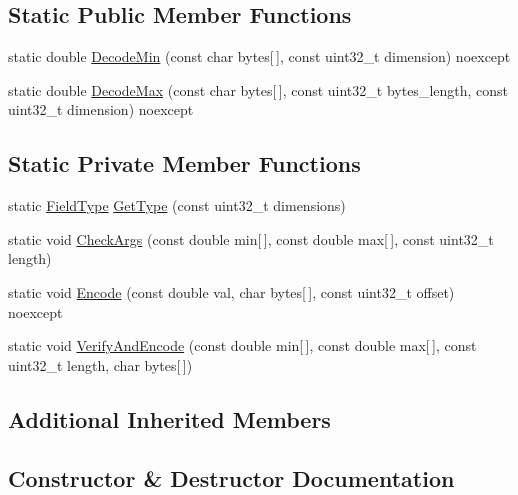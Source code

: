 \subsection*{Static Public Member Functions}
\begin{DoxyCompactItemize}
\item 
static double \mbox{\hyperlink{classlucene_1_1core_1_1document_1_1DoubleRange_a736e2ceb6f00b32f7867ec702da059b4}{Decode\+Min}} (const char bytes\mbox{[}$\,$\mbox{]}, const uint32\+\_\+t dimension) noexcept
\item 
static double \mbox{\hyperlink{classlucene_1_1core_1_1document_1_1DoubleRange_ad344a7b94c98b695feae8728ddc0de63}{Decode\+Max}} (const char bytes\mbox{[}$\,$\mbox{]}, const uint32\+\_\+t bytes\+\_\+length, const uint32\+\_\+t dimension) noexcept
\end{DoxyCompactItemize}
\subsection*{Static Private Member Functions}
\begin{DoxyCompactItemize}
\item 
static \mbox{\hyperlink{classlucene_1_1core_1_1document_1_1FieldType}{Field\+Type}} \mbox{\hyperlink{classlucene_1_1core_1_1document_1_1DoubleRange_a358b2b706f12ead3d2ca826d2faf7cf4}{Get\+Type}} (const uint32\+\_\+t dimensions)
\item 
static void \mbox{\hyperlink{classlucene_1_1core_1_1document_1_1DoubleRange_a10f3d27b685db535202452f5ba8693b9}{Check\+Args}} (const double min\mbox{[}$\,$\mbox{]}, const double max\mbox{[}$\,$\mbox{]}, const uint32\+\_\+t length)
\item 
static void \mbox{\hyperlink{classlucene_1_1core_1_1document_1_1DoubleRange_a2763582d3f37e3a080fc1e2afe48277c}{Encode}} (const double val, char bytes\mbox{[}$\,$\mbox{]}, const uint32\+\_\+t offset) noexcept
\item 
static void \mbox{\hyperlink{classlucene_1_1core_1_1document_1_1DoubleRange_a2171d66292b3437034c90c68baaa08db}{Verify\+And\+Encode}} (const double min\mbox{[}$\,$\mbox{]}, const double max\mbox{[}$\,$\mbox{]}, const uint32\+\_\+t length, char bytes\mbox{[}$\,$\mbox{]})
\end{DoxyCompactItemize}
\subsection*{Additional Inherited Members}


\subsection{Constructor \& Destructor Documentation}
\mbox{\label{classlucene_1_1core_1_1document_1_1DoubleRange_ac6c5423e8f054367ecd48401865f5ab5}} 
